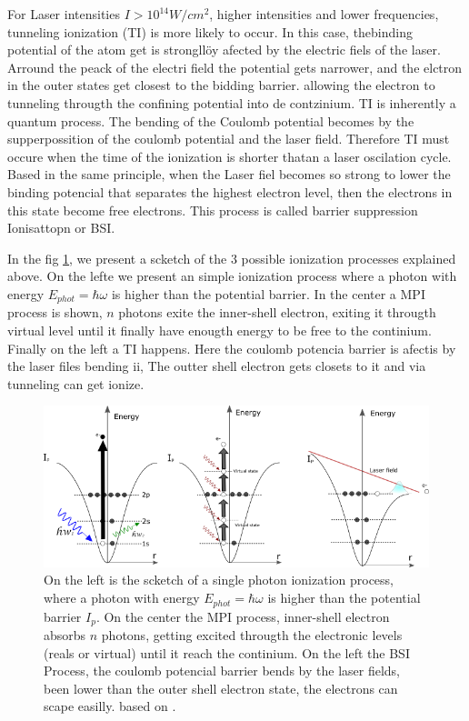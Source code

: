 For Laser intensities $I > 10^{14}W/cm^{2}$, higher intensities and lower frequencies, tunneling ionization (TI) is more likely to occur.  In this case, thebinding potential of the atom get is strongllöy afected by the electric fiels of the laser. Arround the peack of the electri field the  potential gets narrower, and the elctron in the outer states get closest to the bidding barrier. allowing the electron to tunneling througth the confining potential into de contzinium\cite{griffiths_introduction_2013}. TI is inherently a quantum process. The bending of the Coulomb potential becomes by the supperpossition of the coulomb potential and the laser field. Therefore TI must occure when the time of the ionization is shorter thatan a laser oscilation cycle\cite{berkowitz_photoabsorption_1979}. Based in the same principle, when the Laser fiel becomes so strong to lower the binding potencial that separates the highest electron level, then the electrons in this state become free electrons. This process is called barrier suppression Ionisattopn or BSI\cite{krishnan_doped_2011}.

In the fig \ref{img:ionizationprocess}, we present a scketch of the 3 possible ionization processes explained above. On the lefte we present an simple ionization process where a photon with energy $E_{phot} = \hbar\omega$ is higher than the potential barrier. In the center a MPI process is shown, $n$ photons exite the inner-shell electron, exiting it througth virtual level until it finally have enougth energy to be free to the continium. Finally on the left a TI happens. Here the coulomb potencia barrier is afectis by the laser files bending ii, The outter shell electron  gets closets to it and via tunneling  can get ionize\cite{rafipoor_two-color_2017}.

\begin{figure}[hbtp]
\label{img:ionizationprocess}
\centering
\includegraphics[width = 8 cm]{../Images/photoionization2.png}
\caption[Ionization regimes]{ On the left is the scketch of a single photon ionization process, where a photon with energy $E_{phot} = \hbar\omega$ is higher than the potential barrier $I_{p}$. On the center the MPI process,  inner-shell electron absorbs $n$ photons, getting excited througth the electronic levels (reals or virtual)  until it reach the continium. On the left the BSI Process, the coulomb potencial barrier bends by the laser fields, been lower than the outer shell electron state, the electrons can scape easilly. based on \cite{rafipoor_two-color_2017}.}
\end{figure}


